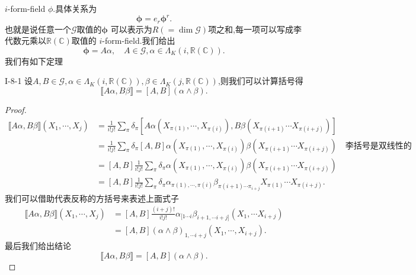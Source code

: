\documentclass[../main.tex]{subfiles}
\begin{document}
$i$-form-field $\phi$.具体关系为\[
  \bm{\phi} = e_r \bm{\phi}^r  
.\] 
也就是说任意一个$\mathscr{G}$取值的$\bm{\phi} $ 可以表示为$R(= \dim{\mathscr{G}})$项之和,每一项可以写成李代数元乘以$\mathbb{R}(\mathbb{C})$取值的 $i$-form-field.我们给出\[
  \bm{\phi} = A \alpha,\quad A\in \mathscr{G}, \alpha\in \Lambda_{K}(i,\mathbb{R}(\mathbb{C})) 
.\] 
我们有如下定理
\begin{theorem}
  {}{I-8-1} 
  设$A,B \in \mathscr{G},\alpha \in \Lambda_K(i,\mathbb{R}(\mathbb{C})),\beta \in \Lambda_K(j,\mathbb{R}(\mathbb{C}))$,则我们可以计算括号得 \[
    \llbracket A\alpha, B\beta\rrbracket = [A,B](\alpha \wedge \beta) 
  .\] 
\end{theorem}
\begin{proof}
  \begin{align*}
    \llbracket A\alpha ,B\beta \rrbracket (X_1,\cdots,X_j) & = \frac{1}{i!j!} \sum_{\pi} \delta_\pi[A\alpha(X_{\pi(1)},\cdots,X_{\pi(i)}),B\beta(X_{\pi(i+1)} \cdots X_{\pi(i+j)})]\\
                                                           & = \frac{1}{i!j!} \sum_{\pi} \delta_\pi[A,B]\alpha(X_{\pi(1)},\cdots,X_{\pi(i)})\beta(X_{\pi(i+1)} \cdots X_{\pi(i+j)}) \quad \text{李括号是双线性的}\\
                                                           & = [A,B]\frac{1}{i!j!} \sum_{\pi} \delta_\pi \alpha(X_{\pi(1)},\cdots,X_{\pi(i)})\beta(X_{\pi(i+1)} \cdots X_{\pi(i+j)}) \\
                                                           & = [A,B] \frac{1}{i!j!} \sum_{\pi} \delta_\pi \alpha_{\pi(1),\cdots,\pi(i)}\beta_{\pi(i+1)\cdots\pi_{i+j}} X_{\pi(1)} \cdots X_{\pi(i+j)}
  .\end{align*}
我们可以借助代表反称的方括号来表述上面式子
\begin{align*}
  \llbracket A\alpha ,B\beta \rrbracket (X_1,\cdots,X_j) & =  [A,B]\frac{(i+j)!}{i!j!} \alpha_{[1\cdots i}\beta_{i+1,\cdots i+j]}(X_1,\cdots X_{i+j})\\
                                                         & = [A,B](\alpha \wedge \beta)_{1,\cdots i+j}(X_1,\cdots,X_{i+j})
.\end{align*}
最后我们给出结论\[
  \llbracket A\alpha,B\beta \rrbracket = [A,B](\alpha\wedge \beta) 
.\] 
\end{proof}
\end{document}
